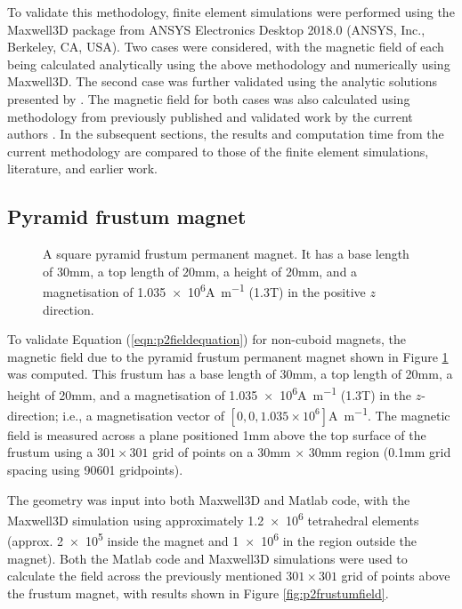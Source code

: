 To validate this methodology, finite element simulations were performed using the Maxwell3D package from ANSYS Electronics Desktop 2018.0 (ANSYS, Inc., Berkeley, CA, USA). Two cases were considered, with the magnetic field of each being calculated analytically using the above methodology and numerically using Maxwell3D. The second case was further validated using the analytic solutions presented by \textcite{Caciagli2018}. The magnetic field for both cases was also calculated using methodology from previously published and validated work by the current authors \cite{OConnell2020}. In the subsequent sections, the results and computation time from the current methodology are compared to those of the finite element simulations, literature, and earlier work.

\subsection{Pyramid frustum magnet}

\begin{figure}
	\centering
	
	\caption{A square pyramid frustum permanent magnet. It has a base length of 30\si{\milli\metre}, a top length of 20\si{\milli\metre}, a height of 20\si{\milli\metre}, and a magnetisation of \num{1.035e6}\si{\ampere\per\metre} (1.3\si{\tesla}) in the positive \(z\) direction.}
	\label{fig:p2frustum}
\end{figure}

To validate Equation (\ref{eqn:p2fieldequation}) for non-cuboid magnets, the magnetic field due to the pyramid frustum permanent magnet shown in Figure \ref{fig:p2frustum} was computed. This frustum has a base length of 30\si{\milli\metre}, a top length of 20\si{\milli\metre}, a height of 20\si{\milli\metre}, and a magnetisation of \num{1.035e6}\si{\ampere\per\metre} (1.3\si{\tesla}) in the \(z\)-direction; i.e., a magnetisation vector of \(\left[0,0,1.035 \times 10^6\right]\)\si{\ampere\per\metre}. The magnetic field is measured across a plane positioned 1mm above the top surface of the frustum using a \(301\times301\) grid of points on a 30\si{\milli\metre} \(\times\) 30\si{\milli\metre} region (0.1\si{\milli\metre} grid spacing using 90601 gridpoints).

The geometry was input into both Maxwell3D and Matlab code, with the Maxwell3D simulation using approximately \num{1.2e6} tetrahedral elements (approx. \num{2e5} inside the magnet and \num{1e6} in the region outside the magnet). Both the Matlab code and Maxwell3D simulations were used to calculate the field across the previously mentioned \(301\times301\) grid of points above the frustum magnet, with results shown in Figure \ref{fig:p2frustumfield}.

